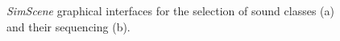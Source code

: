\documentclass[12pt]{elsarticle}
\newcommand{\myfloatalign}{\centering}
\providecommand{\DIFdelbegin}{} %
\providecommand{\DIFdelend}{} %
\begin{document}
\begin{figure}[!tp]
		\myfloatalign
         \par
       \caption{\emph{SimScene} graphical interfaces for the selection of sound classes (a) and their sequencing (b).}
\end{figure}

\DIFdelbegin %

\DIFdelend %
\end{document}
